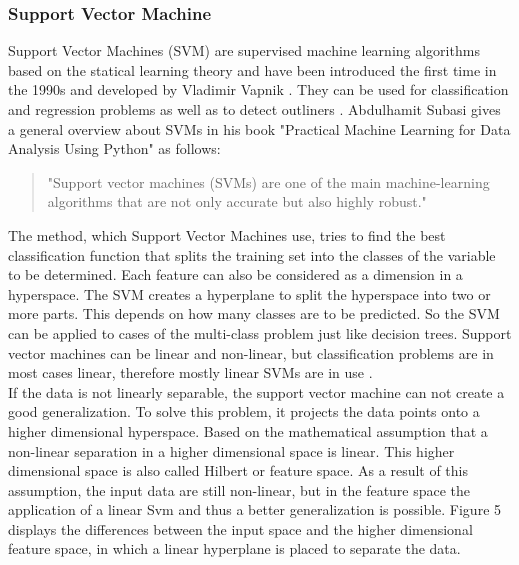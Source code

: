 \documentclass[../masterarbeit.tex]{subfiles}
\begin{document}
\subsubsection{Support Vector Machine}

Support Vector Machines (SVM) are supervised machine learning algorithms based on the statical learning theory and have been introduced the first time in the 1990s and developed by Vladimir Vapnik \textcite[]{ibm-supervised-learning:2022} \textcite[]{SUGUMARAN2007930} \textcite[]{GHOLAMI2017515}. They can be used for classification and regression problems as well as to detect outliners \textcite[]{ibm-supervised-learning:2022} \textcite[]{Scikit-learn-svm:2022}.
Abdulhamit Subasi gives a general overview about SVMs in his book "Practical Machine Learning for Data Analysis Using Python" as follows:
\begin{quote}
	"Support vector machines (SVMs) are one of the main machine-learning algorithms that are not only accurate but also highly robust." \autocite{SUBASI202091}
\end{quote} 
The method, which Support Vector Machines use, tries to find the best classification function that splits the training set into the classes of the variable to be determined. \autocite[]{SUBASI202091}
Each feature can also be considered as a dimension in a hyperspace. The SVM creates a hyperplane to split the hyperspace into two or more parts. This depends on how many classes are to be predicted.
So the SVM can be applied to cases of the multi-class problem just like decision trees. \autocite[]{SUGUMARAN2007930}
Support vector machines can be linear and non-linear, but classification problems are in most cases linear, therefore mostly linear SVMs are in use \textcite[]{PISNER2020101}. \\
If the data is not linearly separable, the support vector machine can not create a good generalization. To solve this problem, it projects the data points onto a higher dimensional hyperspace. Based on the mathematical assumption that a non-linear separation in a higher dimensional space is linear. This higher dimensional space is also called Hilbert or feature space. As a result of this assumption, the input data are still non-linear, but in the feature space the application of a linear Svm and thus a better generalization is possible. Figure 5 displays the differences between the input space and the higher dimensional feature space, in which a linear hyperplane is placed to separate the data. \autocite[]{GHOLAMI2017515} \\
\end{document}
